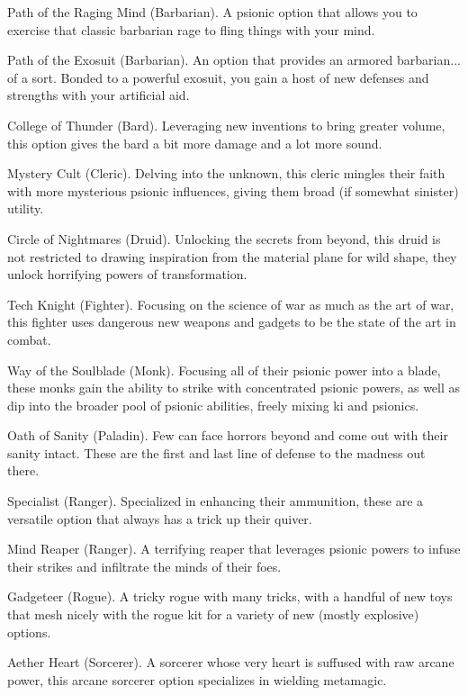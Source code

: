 \documentclass[11pt,twoside,openany]{book}  %
\begin{document}
\begin{fiveitemize}
	\item Path of the Raging Mind (Barbarian). A psionic option that allows you to exercise that classic barbarian rage to fling things with your mind.
	\item Path of the Exosuit (Barbarian). An option that provides an armored barbarian... of a sort. Bonded to a powerful exosuit, you gain a host of new defenses and strengths with your artificial aid.
	\item College of Thunder (Bard). Leveraging new inventions to bring greater volume, this option gives the bard a bit more damage and a lot more sound.
	\item Mystery Cult (Cleric). Delving into the unknown, this cleric mingles their faith with more mysterious psionic influences, giving them broad (if somewhat sinister) utility.
	\item Circle of Nightmares (Druid). Unlocking the secrets from beyond, this druid is not restricted to drawing inspiration from the material plane for wild shape, they unlock horrifying powers of transformation.
	\item Tech Knight (Fighter). Focusing on the science of war as much as the art of war, this fighter uses dangerous new weapons and gadgets to be the state of the art in combat.
	\item Way of the Soulblade (Monk). Focusing all of their psionic power into a blade, these monks gain the ability to strike with concentrated psionic powers, as well as dip into the broader pool of psionic abilities, freely mixing ki and psionics.
	\item Oath of Sanity (Paladin). Few can face horrors beyond and come out with their sanity intact. These are the first and last line of defense to the madness out there.
	\item Specialist (Ranger). Specialized in enhancing their ammunition, these are a versatile option that always has a trick up their quiver.
	\item Mind Reaper (Ranger). A terrifying reaper that leverages psionic powers to infuse their strikes and infiltrate the minds of their foes.
	\item Gadgeteer (Rogue). A tricky rogue with many tricks, with a handful of new toys that mesh nicely with the rogue kit for a variety of new (mostly explosive) options.
	\item Aether Heart (Sorcerer). A sorcerer whose very heart is suffused with raw arcane power, this arcane sorcerer option specializes in wielding metamagic.

\end{fiveitemize}
\end{document}
